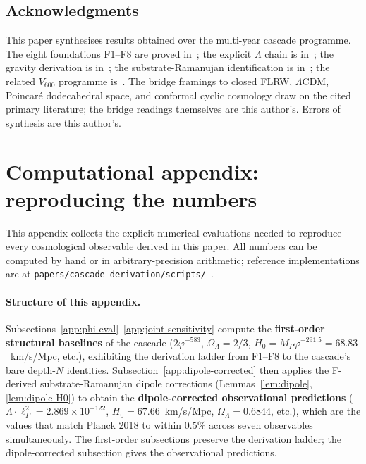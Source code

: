 \documentclass[11pt]{article}
\theoremstyle{plain}
\theoremstyle{definition}
\theoremstyle{remark}
\begin{document}
\subsection*{Acknowledgments}

This paper synthesises results obtained over the multi-year cascade programme. The eight foundations F1--F8 are proved in~\citet{SmartXXXVI}; the explicit $\Lambda$ chain is in~\citet{cascadeLambda}; the gravity derivation is in~\citet{cascadeGR}; the substrate-Ramanujan identification is in~\citet{rhTwoSphere}; the related $V_{600}$ programme is~\citep{v600Unified}. The bridge framings to closed FLRW, $\Lambda$CDM, Poincar\'e dodecahedral space, and conformal cyclic cosmology draw on the cited primary literature; the bridge readings themselves are this author's. Errors of synthesis are this author's.

\appendix
\section{Computational appendix: reproducing the numbers}\label{app:numerical}

This appendix collects the explicit numerical evaluations needed to reproduce every cosmological observable derived in this paper. All numbers can be computed by hand or in arbitrary-precision arithmetic; reference implementations are at \texttt{papers/cascade-derivation/scripts/}~\citep{cascadeLambda}.

\paragraph{Structure of this appendix.} Subsections~\ref{app:phi-eval}--\ref{app:joint-sensitivity} compute the \textbf{first-order structural baselines} of the cascade ($2\varphi^{-583}$, $\Omega_\Lambda = 2/3$, $H_0 = M_P\varphi^{-291.5} = 68.83$~km/s/Mpc, etc.), exhibiting the derivation ladder from F1--F8 to the cascade's bare depth-$N$ identities. Subsection~\ref{app:dipole-corrected} then applies the F-derived substrate-Ramanujan dipole corrections (Lemmas~\ref{lem:dipole}, \ref{lem:dipole-H0}) to obtain the \textbf{dipole-corrected observational predictions} ($\Lambda \cdot \ell_P^2 = 2.869 \times 10^{-122}$, $H_0 = 67.66$~km/s/Mpc, $\Omega_\Lambda = 0.6844$, etc.), which are the values that match Planck 2018 to within $0.5\%$ across seven observables simultaneously. The first-order subsections preserve the derivation ladder; the dipole-corrected subsection gives the observational predictions.
\end{document}
